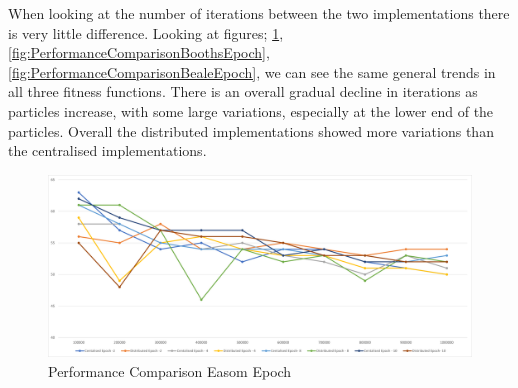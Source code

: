 \documentclass[oneside,12pt]{book}
\begin{document}
\begin{table}[H]
  \caption{TTS Results for 1,000,000 Particles}    
  \label{tab:TTSOneMillion}%
\end{table}%

When looking at the number of iterations between the two implementations there is very little difference. Looking at figures; \ref{fig:PerformanceComparisonEasomEpoch}, \ref{fig:PerformanceComparisonBoothsEpoch}, \ref{fig:PerformanceComparisonBealeEpoch}, we can see the same general trends in all three fitness functions. There is an overall gradual decline in iterations as particles increase, with some large variations, especially at the lower end of the particles. Overall the distributed implementations showed more variations than the centralised implementations. 

\begin{figure}[H]
    \centering
    \includegraphics[scale=0.45]{Images/Graphs/PerformanceComparisonEasomEpoch.png}
    \caption{Performance Comparison Easom Epoch}
    \label{fig:PerformanceComparisonEasomEpoch}
\end{figure}
\end{document}
